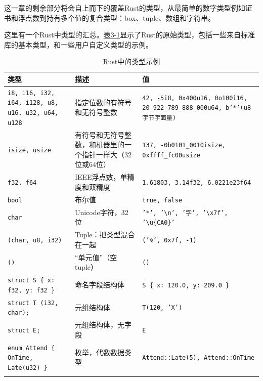 这一章的剩余部分将会自上而下的覆盖Rust的类型，从最简单的数字类型例如证书和浮点数到持有多个值的复合类型：box、tuple、数组和字符串。

这里有一个Rust中类型的汇总。\hyperref[t3-1]{表3-1}显示了Rust的原始类型，包括一些来自标准库的基本类型，和一些用户自定义类型的示例。

\begin{longtable}{p{}p{}p{}}
    \caption{Rust中的类型示例}
    \label{t3-1}\\
    \hline
    \textbf{类型}   & \textbf{描述}    & \textbf{值}    \\
    \hline
    \texttt{i8, i16, i32, i64, i128, u8, u16, u32, u64, u128}    & 指定位数的有符号和无符号整数 & \texttt{42, -5i8, 0x400u16, 0o100i16, 20\_922\_789\_888\_000u64, b'*'(u8字节字面量)}    \\
    \rowcolor{tablecolor}
    \texttt{isize, usize}   & 有符号和无符号整数，和机器里的一个指针一样大（32位或64位）   & \texttt{137, -0b0101\_0010isize, 0xffff\_fc00usize} \\
    \texttt{f32, f64}       & IEEE浮点数，单精度和双精度                                & \texttt{1.61803, 3.14f32, 6.0221e23f64} \\
    \rowcolor{tablecolor}
    \texttt{bool}           & 布尔值            & \texttt{true, false} \\
    \texttt{char}           & Unicode字符，32位 & \texttt{'*', '\textbackslash n', '字', '\textbackslash x7f', '\textbackslash u\{CA0\}'} \\
    \rowcolor{tablecolor}
    \texttt{(char, u8, i32)}                        & Tuple：把类型混合在一起   & \texttt{('\%', 0x7f, -1)} \\
    \texttt{()}                                     & “单元值”（空tuple）      & \texttt{()} \\
    \rowcolor{tablecolor}
    \texttt{struct S \{ x: f32, y: f32 \}}          & 命名字段结构体            & \texttt{S \{ x: 120.0, y: 209.0 \}} \\
    \texttt{struct T (i32, char);}                  & 元组结构体                & \texttt{T(120, 'X')} \\
    \rowcolor{tablecolor}
    \texttt{struct E;}                              & 元组结构体，无字段        & \texttt{E} \\
    \texttt{enum Attend \{ OnTime, Late(u32) \}}    & 枚举，代数数据类型        & \texttt{Attend::Late(5), Attend::OnTime} \\
    \rowcolor{tablecolor}

\end{longtable}
